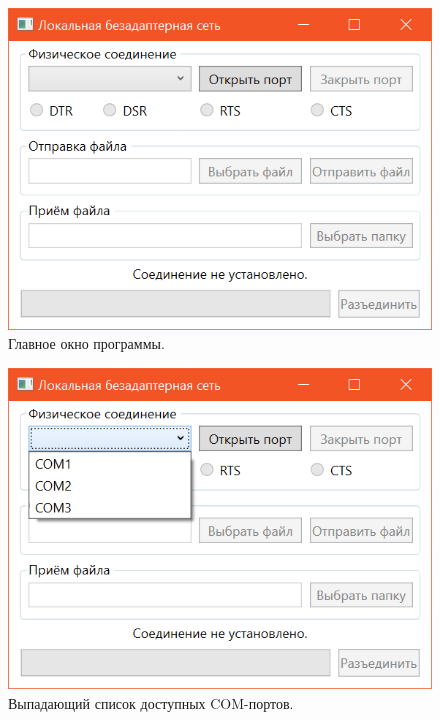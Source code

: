 \documentclass[a4paper,12pt]{article}
\begin{document}
\begin{figure}
\centering
\includegraphics{window.png}
\caption{Главное окно программы.}\label{window}
\end{figure}
\begin{figure}
\centering
\includegraphics{list.png}
\caption{Выпадающий список доступных COM-портов.}\label{list}
\end{figure}
\end{document}
